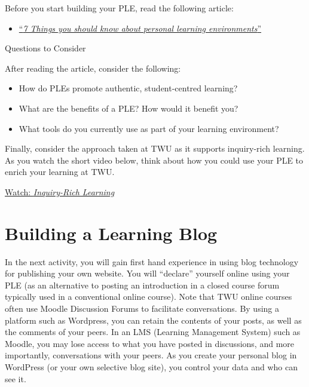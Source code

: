 \documentclass[
]{book}
\providecommand{\tightlist}{%
  \setlength{\itemsep}{0pt}\setlength{\parskip}{0pt}}
\theoremstyle{definition}
\theoremstyle{definition}
\theoremstyle{definition}
\theoremstyle{definition}
\theoremstyle{remark}
\begin{document}
\begin{reflect}
Before you start building your PLE, read the following article:

\begin{itemize}
\tightlist
\item
  \href{assets/u4/U4_7-things-you-should-know-about-PLNs.pdf}{``\emph{7 Things you should know about personal learning environments}''}
\end{itemize}

{Questions to Consider}

After reading the article, consider the following:

\begin{itemize}
\tightlist
\item
  How do PLEs promote authentic, student-centred learning?\\
\item
  What are the benefits of a PLE? How would it benefit you?\\
\item
  What tools do you currently use as part of your learning environment?
\end{itemize}

Finally, consider the approach taken at TWU as it supports inquiry-rich learning. As you watch the short video below, think about how you could use your PLE to enrich your learning at TWU.

\href{https://www.youtube.com/watch?v=SCa9Nt3X1vU}{Watch: \emph{Inquiry-Rich Learning}}
\end{reflect}

\hypertarget{building-a-learning-blog}{%
\section{Building a Learning Blog}\label{building-a-learning-blog}}

In the next activity, you will gain first hand experience in using blog technology for publishing your own website. You will ``declare'' yourself online using your PLE (as an alternative to posting an introduction in a closed course forum typically used in a conventional online course). Note that TWU online courses often use Moodle Discussion Forums to facilitate conversations. By using a platform such as Wordpress, you can retain the contents of your posts, as well as the comments of your peers. In an LMS (Learning Management System) such as Moodle, you may lose access to what you have posted in discussions, and more importantly, conversations with your peers. As you create your personal blog in WordPress (or your own selective blog site), you control your data and who can see it.
\end{document}
